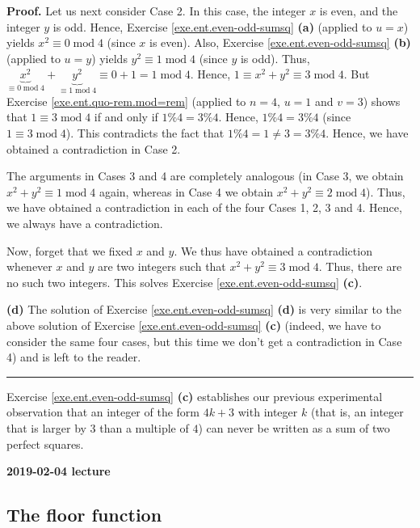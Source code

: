 \documentclass[numbers=enddot,12pt,final,onecolumn,notitlepage]{scrartcl}%
\numberwithin{exer}{subsection}
\theoremstyle{definition}
\newenvironment{fineprint}{\begin{small}}{\end{small}}
\newenvironment{proof}[1][Proof]{\noindent\textbf{#1.} }{\ \rule{0.5em}{0.5em}}
\begin{document}
\begin{fineprint}
\begin{proof}
Let us next consider Case 2. In this case, the integer $x$ is even, and the
integer $y$ is odd. Hence, Exercise \ref{exe.ent.even-odd-sumsq} \textbf{(a)}
(applied to $u=x$) yields $x^{2}\equiv0\operatorname{mod}4$ (since $x$ is
even). Also, Exercise \ref{exe.ent.even-odd-sumsq} \textbf{(b)} (applied to
$u=y$) yields $y^{2}\equiv1\operatorname{mod}4$ (since $y$ is odd). Thus,
$\underbrace{x^{2}}_{\equiv0\operatorname{mod}4}+\underbrace{y^{2}}%
_{\equiv1\operatorname{mod}4}\equiv0+1=1\operatorname{mod}4$. Hence, $1\equiv
x^{2}+y^{2}\equiv3\operatorname{mod}4$. But Exercise
\ref{exe.ent.quo-rem.mod=rem} (applied to $n=4$, $u=1$ and $v=3$) shows that
$1\equiv3\operatorname{mod}4$ if and only if $1\%4=3\%4$. Hence, $1\%4=3\%4$
(since $1\equiv3\operatorname{mod}4$). This contradicts the fact that
$1\%4=1\neq3=3\%4$. Hence, we have obtained a contradiction in Case 2.

The arguments in Cases 3 and 4 are completely analogous (in Case 3, we obtain
$x^{2}+y^{2}\equiv1\operatorname{mod}4$ again, whereas in Case 4 we obtain
$x^{2}+y^{2}\equiv2\operatorname{mod}4$). Thus, we have obtained a
contradiction in each of the four Cases 1, 2, 3 and 4. Hence, we always have a contradiction.

Now, forget that we fixed $x$ and $y$. We thus have obtained a contradiction
whenever $x$ and $y$ are two integers such that $x^{2}+y^{2}\equiv
3\operatorname{mod}4$. Thus, there are no such two integers. This solves
Exercise \ref{exe.ent.even-odd-sumsq} \textbf{(c)}.

\textbf{(d)} The solution of Exercise \ref{exe.ent.even-odd-sumsq}
\textbf{(d)} is very similar to the above solution of Exercise
\ref{exe.ent.even-odd-sumsq} \textbf{(c)} (indeed, we have to consider the
same four cases, but this time we don't get a contradiction in Case 4) and is
left to the reader.
\end{proof}
\end{fineprint}

Exercise \ref{exe.ent.even-odd-sumsq} \textbf{(c)} establishes our previous
experimental observation that an integer of the form $4k+3$ with integer $k$
(that is, an integer that is larger by $3$ than a multiple of $4$) can never
be written as a sum of two perfect squares.

\begin{center}
\textbf{2019-02-04 lecture}
\end{center}

\subsection{The floor function}
\end{document}
